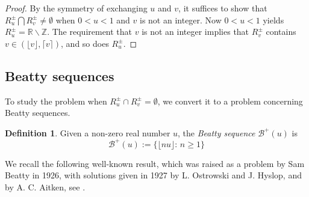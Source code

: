 \documentclass[12pt,letterpaper, reqno]{amsart}
\theoremstyle{definition}
\newtheorem{defi}[thm]{Definition}
\theoremstyle{remark}
\newcommand{\RR}{\ensuremath{\mathbb{R}}}
\newcommand{\ZZ}{\ensuremath{\mathbb{Z}}}
\newcommand{\R}{{R}}
\newcommand{\sB}{{\mathcal B}}
\newcommand{\floor}[1]{\lfloor{#1}\rfloor}
\newcommand{\ceil}[1]{\lceil{#1}\rceil}
\begin{document}
\begin{proof}
By the symmetry of exchanging $u$ and $v$, it suffices to show that
$R_u^{\pm} \bigcap \R_v^{\pm} \ne \emptyset$
when $0< u< 1$ and $v$ is not an integer. 
Now $0<u<1$ yields $R_u^{\pm} = \RR \smallsetminus \ZZ$.
The requirement that  $v$ is not an integer implies that $R_v^{\pm}$ contains $v\in (\floor v,\ceil v)$, and so does $R_u^{\pm}$.
\end{proof}  
  




%
%
\subsection{Beatty sequences}\label{sec:52a}
To study the problem when $\R^\pm_u\cap \R^\pm_v = \emptyset $, we convert it
to a problem concerning Beatty sequences.

\begin{defi}\label{def:44}
 Given a non-zero real number $u$, the {\em Beatty sequence} $\sB^{+}(u)$
is
$$
\sB^{+}(u) := \{ \lfloor n u \rfloor: \,  n \ge 1\}
$$
\end{defi}

We recall the following well-known result, which was raised as a problem 
by Sam Beatty 
in 1926, with solutions given in  1927 by L. Ostrowski and J. Hyslop, 
and by A. C. Aitken,  see \cite{Bea26}.
\end{document}
